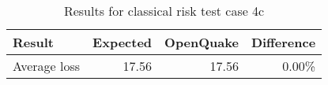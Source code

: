 \begin{table}[htbp]

\centering
\begin{tabular}{ l r r r }

\hline
\rowcolor{anti-flashwhite}
\bf{Result} & \bf{Expected} & \bf{OpenQuake} & \bf{Difference}\\
\hline
Average loss & 17.56 & 17.56 & 0.00\% \\
\hline
\end{tabular}

\caption{Results for classical risk test case 4c}
\label{tab:result-cr-4c}
\end{table}